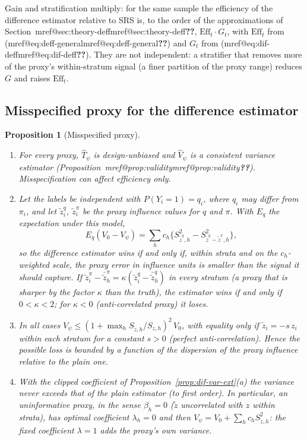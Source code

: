 \documentclass[pdflatex,sn-mathphys-num,iicol]{sn-jnl}
\makeatletter
\theoremstyle{thmstyleone}
\newtheorem{proposition}{Proposition}
\theoremstyle{thmstyletwo}
\theoremstyle{thmstylethree}
\newcommand{\Mref}[1]{\ifcsname mref@#1\endcsname\csname mref@#1\endcsname\else\textbf{??}\fi}
\makeatother
\begin{document}
Gain and stratification multiply: for the same sample the efficiency of the difference estimator relative to SRS is, to the order of the
approximations of Section~\Mref{sec:theory-deff}, $\mathrm{Eff}_t\cdot G_t$, with $\mathrm{Eff}_t$ from
(\Mref{eq:deff-general}) and $G_t$ from (\Mref{eq:dif-deff}). They are not independent: a stratifier that
removes more of the proxy's within-stratum signal (a finer partition of the proxy range) reduces $G$ and raises $\mathrm{Eff}_t$.

\subsection{Misspecified proxy for the difference estimator}\label{si:theory-dif-proxy}

\begin{proposition}[Misspecified proxy]\label{prop:dif-proxy}
\begin{enumerate}
\item[(a)] For every proxy, $\hat T_\psi$ is design-unbiased and $\hat V_\psi$ is a consistent variance estimator
(Proposition~\Mref{prop:validity}). Misspecification can affect efficiency only.
\item[(b)] Let the labels be independent with $P(Y_i=1)=q_i$, where $q_i$ may differ from $\pi_i$, and let $\tilde z^{q}_i$, $\tilde z^{\pi}_i$ be the proxy
influence values for $q$ and $\pi$. With $E_q$ the expectation under this model,
\begin{equation}\label{eq:dif-misspec}
E_q(V_0-V_\psi)=\sum_hc_h\Big\{S^2_{\tilde z^{q},h}-S^2_{\tilde z^{q}-\tilde z^{\pi},h}\Big\},
\end{equation}
so the difference estimator wins if and only if, within strata and on the $c_h$-weighted scale, the proxy error in influence units is smaller than the signal it
should capture. If $\tilde z^{\pi}_i-\bar{\tilde z}^{\pi}_h=\kappa(\tilde z^{q}_i-\bar{\tilde z}^{q}_h)$ in every stratum (a proxy that is sharper by the factor
$\kappa$ than the truth), the estimator wins if and only if $0<\kappa<2$; for $\kappa<0$ (anti-correlated proxy) it loses.
\item[(c)] In all cases $V_\psi\le(1+\max_hS_{\tilde z,h}/S_{z,h})^2\,V_0$, with equality only if $\tilde z_i=-s\,z_i$ within each stratum
for a constant $s>0$ (perfect anti-correlation). Hence the possible loss is bounded by a function of the dispersion of the proxy influence relative to the plain one.
\item[(d)] With the clipped coefficient of Proposition~\ref{prop:dif-var-ext}(a) the variance never exceeds that of the plain estimator
(to first order). In particular, an uninformative proxy, in the sense $\beta_h=0$ ($\tilde z$ uncorrelated with $z$ within strata), has optimal coefficient $\lambda_h=0$ and
then $V_\psi=V_0+\sum_hc_hS^2_{\tilde z,h}$: the fixed coefficient $\lambda=1$ adds the proxy's own variance.
\end{enumerate}
\end{proposition}
\end{document}
